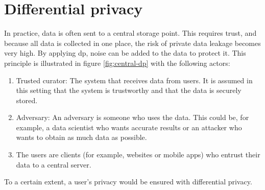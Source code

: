 % 
\section{Differential privacy} \label{section:dp}
In practice, data is often sent to a central storage point.
This requires trust, and because all data is collected in one place, the risk of private data leakage becomes very high.
By applying \gls{dp}, noise can be added to the data to protect it.
This principle is illustrated in figure \ref{fig:central-dp} with the following actors:
\begin{enumerate}
  \item Trusted curator: The system that receives data from users. It is assumed in this setting that the system is trustworthy and that the data is securely stored.
  \item Adversary: An adversary is someone who uses the data. This could be, for example, a data scientist who wants accurate results or an attacker who wants to obtain as much data as possible.
  \item The users are clients (for example, websites or mobile apps) who entrust their data to a central server.
\end{enumerate}
To a certain extent, a user's privacy would be ensured with differential privacy. \newline

